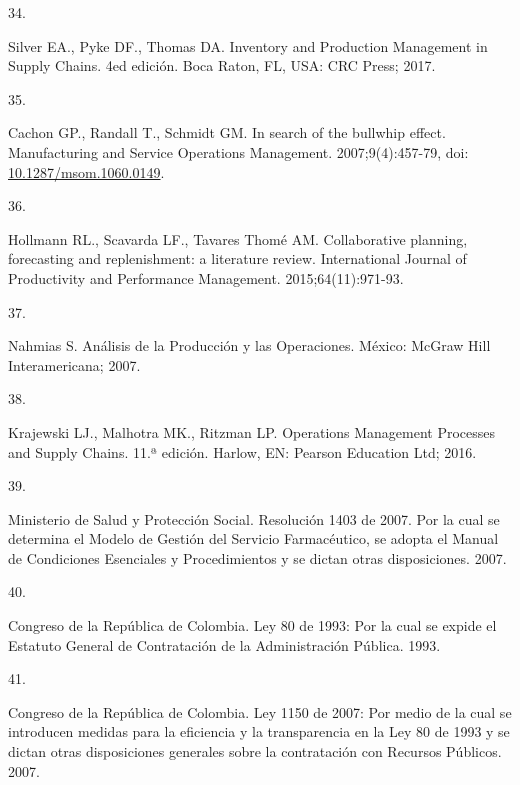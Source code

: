 \documentclass[
  oneside]{book}
\newlength{\cslhangindent}
\newlength{\csllabelwidth}
\newlength{\cslentryspacingunit} %
\newenvironment{CSLReferences}[2] %
 {%
  \setlength{\parindent}{0pt}
  \ifodd #1
  \let\oldpar\par
  \def\par{\hangindent=\cslhangindent\oldpar}
  \fi
  \setlength{\parskip}{#2\cslentryspacingunit}
 }%
 {}
\newcommand{\CSLLeftMargin}[1]{\parbox[t]{\csllabelwidth}{#1}}
\newcommand{\CSLRightInline}[1]{\parbox[t]{\linewidth - \csllabelwidth}{#1}\break}
\begin{document}
\begin{CSLReferences}{0}{0}
\leavevmode{}%
\CSLLeftMargin{34. }
\CSLRightInline{Silver EA., Pyke DF., Thomas DA. {Inventory and Production Management in Supply Chains}. 4ed edición. Boca Raton, FL, USA: CRC Press; 2017.}

\leavevmode{}%
\CSLLeftMargin{35. }
\CSLRightInline{Cachon GP., Randall T., Schmidt GM. {In search of the bullwhip effect}. Manufacturing and Service Operations Management. 2007;9(4):457-79, doi: \href{https://doi.org/10.1287/msom.1060.0149}{10.1287/msom.1060.0149}.}

\leavevmode{}%
\CSLLeftMargin{36. }
\CSLRightInline{Hollmann RL., Scavarda LF., Tavares Thomé AM. {Collaborative planning, forecasting and replenishment: a literature review}. International Journal of Productivity and Performance Management. 2015;64(11):971-93.}

\leavevmode{}%
\CSLLeftMargin{37. }
\CSLRightInline{Nahmias S. {An{á}lisis de la Producci{ó}n y las Operaciones}. M{é}xico: McGraw Hill Interamericana; 2007.}

\leavevmode{}%
\CSLLeftMargin{38. }
\CSLRightInline{Krajewski LJ., Malhotra MK., Ritzman LP. {Operations Management Processes and Supply Chains}. 11.ª edición. Harlow, EN: Pearson Education Ltd; 2016.}

\leavevmode{}%
\CSLLeftMargin{39. }
\CSLRightInline{Ministerio de Salud y Protección Social. {Resoluci{ó}n 1403 de 2007. Por la cual se determina el Modelo de Gesti{ó}n del Servicio Farmac{é}utico, se adopta el Manual de Condiciones Esenciales y Procedimientos y se dictan otras disposiciones}. 2007.}

\leavevmode{}%
\CSLLeftMargin{40. }
\CSLRightInline{Congreso de la República de Colombia. {Ley 80 de 1993: Por la cual se expide el Estatuto General de Contrataci{ó}n de la Administraci{ó}n P{ú}blica}. 1993.}

\leavevmode{}%
\CSLLeftMargin{41. }
\CSLRightInline{Congreso de la República de Colombia. {Ley 1150 de 2007: Por medio de la cual se introducen medidas para la eficiencia y la transparencia en la Ley 80 de 1993 y se dictan otras disposiciones generales sobre la contrataci{ó}n con Recursos P{ú}blicos.} 2007.}


\end{CSLReferences}
\end{document}
